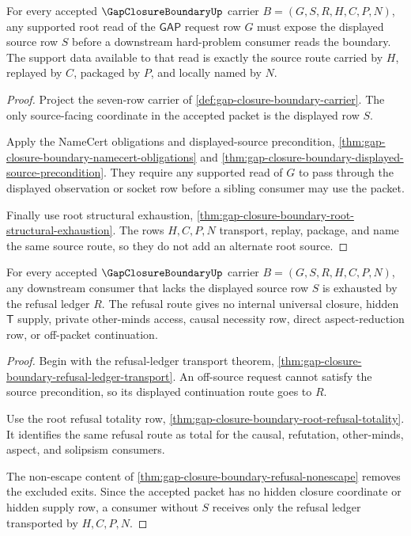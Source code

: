 \begin{theorem}
\label{thm:gap-closure-boundary-root-source-exactness}
For every accepted $\GapClosureBoundaryUp$ carrier $B=(G,S,R,H,C,P,N)$, any supported root read of the $\mathsf{GAP}$ request row $G$ must expose the displayed source row $S$ before a downstream hard-problem consumer reads the boundary. The support data available to that read is exactly the source route carried by $H$, replayed by $C$, packaged by $P$, and locally named by $N$.
\end{theorem}
\begin{proof}
Project the seven-row carrier of \autoref{def:gap-closure-boundary-carrier}. The only source-facing coordinate in the accepted packet is the displayed row $S$.

Apply the NameCert obligations and displayed-source precondition, \autoref{thm:gap-closure-boundary-namecert-obligations} and \autoref{thm:gap-closure-boundary-displayed-source-precondition}. They require any supported read of $G$ to pass through the displayed observation or socket row before a sibling consumer may use the packet.

Finally use root structural exhaustion, \autoref{thm:gap-closure-boundary-root-structural-exhaustion}. The rows $H,C,P,N$ transport, replay, package, and name the same source route, so they do not add an alternate root source.
\end{proof}

\begin{theorem}
\label{thm:gap-closure-boundary-consumer-refusal-exhaustion}
For every accepted $\GapClosureBoundaryUp$ carrier $B=(G,S,R,H,C,P,N)$, any downstream consumer that lacks the displayed source row $S$ is exhausted by the refusal ledger $R$. The refusal route gives no internal universal closure, hidden $\mathsf{T}$ supply, private other-minds access, causal necessity row, direct aspect-reduction row, or off-packet continuation.
\end{theorem}
\begin{proof}
Begin with the refusal-ledger transport theorem, \autoref{thm:gap-closure-boundary-refusal-ledger-transport}. An off-source request cannot satisfy the source precondition, so its displayed continuation route goes to $R$.

Use the root refusal totality row, \autoref{thm:gap-closure-boundary-root-refusal-totality}. It identifies the same refusal route as total for the causal, refutation, other-minds, aspect, and solipsism consumers.

The non-escape content of \autoref{thm:gap-closure-boundary-refusal-nonescape} removes the excluded exits. Since the accepted packet has no hidden closure coordinate or hidden supply row, a consumer without $S$ receives only the refusal ledger transported by $H,C,P,N$.
\end{proof}

